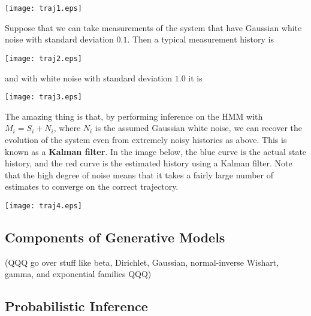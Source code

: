 \documentclass[11pt]{article}
\begin{document}
\begin{center}
 \texttt{[image: traj1.eps]}
\end{center}

Suppose that we can take measurements of the system that have Gaussian white noise with standard deviation $0.1$. Then a typical measurement history is

\begin{center}
 \texttt{[image: traj2.eps]}
\end{center}

and with white noise with standard deviation $1.0$ it is

\begin{center}
 \texttt{[image: traj3.eps]}
\end{center}

The amazing thing is that, by performing inference on the HMM with $M_i = S_i + N_i$, where $N_i$ is the assumed Gaussian white noise, we can recover the evolution of the system even from extremely noisy histories as above. This is known as a \textbf{Kalman filter}. In the image below, the blue curve is the actual state history, and the red curve is the estimated history using a Kalman filter. Note that the high degree of noise means that it takes a fairly large number of estimates to converge on the correct trajectory.

\begin{center}
 \texttt{[image: traj4.eps]}
\end{center}


\subsection{Components of Generative Models}

(QQQ go over stuff like beta, Dirichlet, Gaussian, normal-inverse Wishart, gamma, and exponential families QQQ)

\subsection{Probabilistic Inference}
\end{document}
